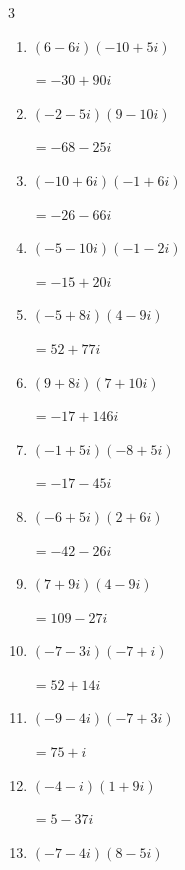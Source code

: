 \begin{multicols}{3}
\begin{enumerate}
        $\displaystyle =10-45i$

\columnbreak %

\resetques

  \item $\displaystyle (6-6i)(-10+5i)$

        $\displaystyle =-30+90i$

  \item $\displaystyle (-2-5i)(9-10i)$

        $\displaystyle =-68-25i$

  \item $\displaystyle (-10+6i)(-1+6i)$

        $\displaystyle =-26-66i$

  \item $\displaystyle (-5-10i)(-1-2i)$

        $\displaystyle =-15+20i$

  \item $\displaystyle (-5+8i)(4-9i)$

        $\displaystyle =52+77i$

  \item $\displaystyle (9+8i)(7+10i)$

        $\displaystyle =-17+146i$

  \item $\displaystyle (-1+5i)(-8+5i)$

        $\displaystyle =-17-45i$

  \item $\displaystyle (-6+5i)(2+6i)$

        $\displaystyle =-42-26i$

  \item $\displaystyle (7+9i)(4-9i)$

        $\displaystyle =109-27i$

  \item $\displaystyle (-7-3i)(-7+i)$

        $\displaystyle =52+14i$

  \item $\displaystyle (-9-4i)(-7+3i)$

        $\displaystyle =75+i$

  \item $\displaystyle (-4-i)(1+9i)$

        $\displaystyle =5-37i$

  \item $\displaystyle (-7-4i)(8-5i)$


\end{enumerate}
\end{multicols}
